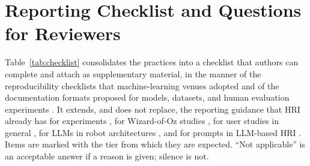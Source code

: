 \section{Reporting Checklist and Questions for Reviewers}
\label{sec:reporting}

Table~\ref{tab:checklist} consolidates the practices into a checklist that
authors can complete and attach as supplementary material, in the manner of
the reproducibility checklists that machine-learning venues adopted
\cite{pineau2021improving} and of the documentation formats proposed for
models, datasets, and human evaluation experiments
\cite{mitchell2019model,gebru2021datasheets,shimorina2022human}. It extends,
and does not replace, the reporting guidance that HRI already has for
experiments \cite{hoffman2020primer,baxter2016characterising}, for
Wizard-of-Oz studies \cite{riek2012wizard}, for user studies in general
\cite{chandra2026rush}, for LLMs in robot architectures
\cite{matuszek2026reporting}, and for prompts in LLM-based HRI
\cite{ashok2026why}. Items are marked with the tier from which they are
expected. ``Not applicable'' is an acceptable answer if a reason is given;
silence is not.

